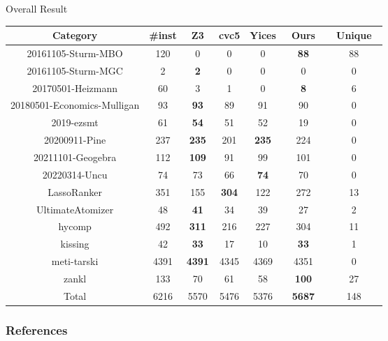 \begin{frame}{Overall Result}
    \begin{table}[!t]
        \centering
        \small
        \begin{tabular}{c | c | c | c | c | c | c}
                    Category & \#inst & Z3 & cvc5 & Yices & ~Ours~ & ~Unique~ \\ \hline
                    20161105-Sturm-MBO & 120 & 0 & 0 & 0 & \textbf{88} & 88 \\
                    20161105-Sturm-MGC & 2 & \textbf{2} & 0 & 0 & 0 & 0 \\
                    20170501-Heizmann & 60 & 3 & 1 & 0 & \textbf{8} & 6 \\
                    20180501-Economics-Mulligan & 93 & \textbf{93} & 89 & 91 & 90 & 0 \\
                    2019-ezsmt & 61 & \textbf{54} & 51 & 52 & 19 & 0 \\
                    20200911-Pine & 237 & \textbf{235} & 201 & \textbf{235} & 224 & 0 \\
                    20211101-Geogebra & 112 & \textbf{109} & 91 & 99 & 101 & 0 \\
                    20220314-Uncu & 74 & 73 & 66 & \textbf{74} & 70 & 0 \\
                    LassoRanker & 351 & 155 & \textbf{304} & 122 & 272 & 13\\
                    UltimateAtomizer & 48 & \textbf{41} & 34 & 39 & 27 & 2 \\
                    hycomp & 492 & \textbf{311} & 216 & 227 & 304 & 11 \\
                    kissing & 42 & \textbf{33} & 17 & 10 & \textbf{33} & 1 \\
                    meti-tarski & 4391 & \textbf{4391} & 4345 & 4369 & 4351 & 0 \\
                    zankl & 133 & 70 & 61 & 58 & \textbf{100} & 27 \\ \hline
                    Total & 6216 & 5570 & 5476 & 5376 & \textbf{5687} & 148 
                \end{tabular}
        \end{table}
\end{frame}

\begin{frame}[allowframebreaks]
    \frametitle{References}
\printbibliography
\end{frame}